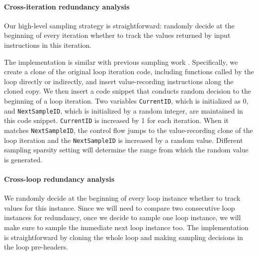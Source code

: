 
\paragraph{Cross-iteration redundancy analysis}
Our high-level sampling strategy is straightforward:
randomly decide at the
beginning of every iteration whether to track the values returned by
input instructions in this iteration.

The implementation is similar with previous sampling work 
\cite{liblit03,liblit05}.
Specifically, we create a clone of the original
loop iteration code, including functions called by the loop directly or
indirectly, and insert value-recording instructions along the
cloned copy. 
We then insert a code snippet that conducts random decision to
the beginning of a loop iteration. 
Two variables \texttt{CurrentID}, which is initialized as 0, 
and \texttt{NextSampleID}, which is initialized by a random integer, 
are maintained
in this code snippet. \texttt{CurrentID} is increased by 1
for each iteration. When it matches \texttt{NextSampleID}, the control
flow jumps to the value-recording clone of the loop iteration and the 
\texttt{NextSampleID} is increased by a random value. Different sampling
sparsity setting will determine the range from which the random value is
generated.


\paragraph{Cross-loop redundancy analysis} 
We randomly decide at the beginning
of every loop instance whether to track values for this instance. 
Since we will need to compare two consecutive loop
instances for redundancy, once we decide to sample one loop instance, we will
make sure to sample the immediate next loop instance too.
The implementation is straightforward by cloning the whole loop and making
sampling decisions in the loop pre-headers.

